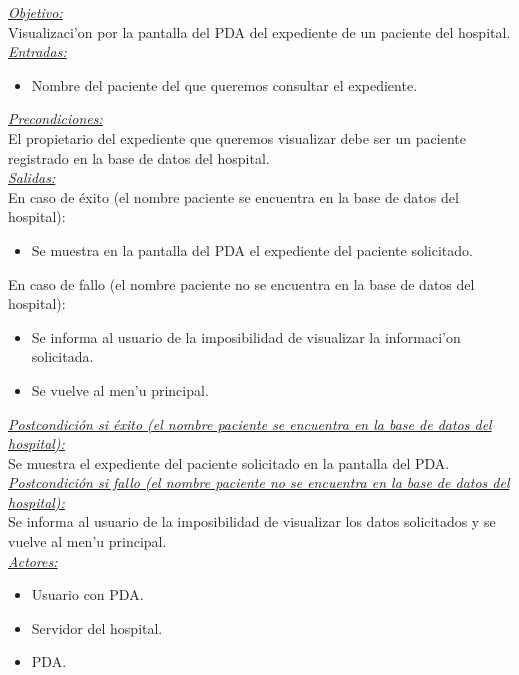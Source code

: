 \emph{\underline{Objetivo:}}\\

Visualizaci'on por la pantalla del PDA del expediente de un paciente del hospital.\\

\emph{\underline{Entradas:}}
\begin{itemize}
\item Nombre del paciente del que queremos consultar el expediente.
\end{itemize}

\emph{\underline{Precondiciones:}}\\

El propietario del expediente que queremos visualizar debe ser un paciente registrado en la base de datos del hospital.\\

\emph{\underline{Salidas:}}\\
	
En caso de \'exito (el nombre paciente se encuentra en la base de datos del hospital): 
\begin{itemize}
	\item Se muestra en la pantalla del PDA el expediente del paciente solicitado.
\end{itemize}

En caso de fallo (el nombre paciente no se encuentra en la base de datos del hospital): 
\begin{itemize}
	\item Se informa al usuario de la imposibilidad de visualizar la informaci'on solicitada.
	\item Se vuelve al men'u principal.
\end{itemize}

\emph{\underline{Postcondici\'on si \'exito (el nombre paciente se encuentra en la base de datos del hospital):}}\\

Se muestra el expediente del paciente solicitado en la pantalla del PDA.\\

\emph{\underline{Postcondici\'on si fallo (el nombre paciente no se encuentra en la base de datos del hospital):}}\\

Se informa al usuario de la imposibilidad de visualizar los datos solicitados y se vuelve al men'u principal.\\

\emph{\underline{Actores: }}
\begin{itemize}
	\item Usuario con PDA.
	\item Servidor del hospital.
	\item PDA.
\end{itemize}

